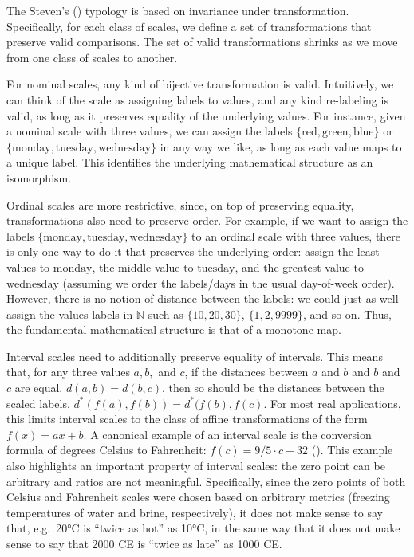 \documentclass[
]{book}
\theoremstyle{definition}
\theoremstyle{definition}
\theoremstyle{definition}
\theoremstyle{definition}
\theoremstyle{remark}
\begin{document}
The Steven's () typology is based on invariance under transformation. Specifically, for each class of scales, we define a set of transformations that preserve valid comparisons. The set of valid transformations shrinks as we move from one class of scales to another.

For nominal scales, any kind of bijective transformation is valid. Intuitively, we can think of the scale as assigning labels to values, and any kind re-labeling is valid, as long as it preserves equality of the underlying values. For instance, given a nominal scale with three values, we can assign the labels \(\{ \text{red}, \text{green}, \text{blue} \}\) or \(\{ \text{monday}, \text{tuesday}, \text{wednesday} \}\) in any way we like, as long as each value maps to a unique label. This identifies the underlying mathematical structure as an isomorphism.

Ordinal scales are more restrictive, since, on top of preserving equality, transformations also need to preserve order. For example, if we want to assign the labels \(\{ \text{monday}, \text{tuesday}, \text{wednesday} \}\) to an ordinal scale with three values, there is only one way to do it that preserves the underlying order: assign the least values to \(\text{monday}\), the middle value to \(\text{tuesday}\), and the greatest value to \(\text{wednesday}\) (assuming we order the labels/days in the usual day-of-week order). However, there is no notion of distance between the labels: we could just as well assign the values labels in \(\mathbb{N}\) such as \(\{ 10, 20, 30 \}\), \(\{1, 2, 9999 \}\), and so on. Thus, the fundamental mathematical structure is that of a monotone map.

Interval scales need to additionally preserve equality of intervals. This means that, for any three values \(a, b,\) and \(c\), if the distances between \(a\) and \(b\) and \(b\) and \(c\) are equal, \(d(a, b) = d(b, c)\), then so should be the distances between the scaled labels, \(d^*(f(a), f(b)) = d^*(f(b), f(c)\). For most real applications, this limits interval scales to the class of affine transformations of the form \(f(x) = ax + b\). A canonical example of an interval scale is the conversion formula of degrees Celsius to Fahrenheit: \(f(c) = 9/5 \cdot c + 32\) (). This example also highlights an important property of interval scales: the zero point can be arbitrary and ratios are not meaningful. Specifically, since the zero points of both Celsius and Fahrenheit scales were chosen based on arbitrary metrics (freezing temperatures of water and brine, respectively), it does not make sense to say that, e.g.~20°C is ``twice as hot'' as 10°C, in the same way that it does not make sense to say that 2000 CE is ``twice as late'' as 1000 CE.
\end{document}
